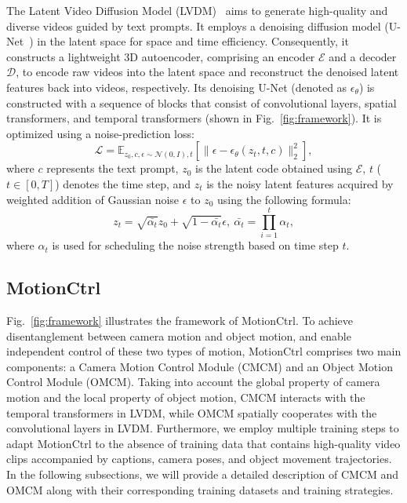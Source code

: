 \documentclass[sigconf]{acmart}
\begin{document}
The Latent Video Diffusion Model (LVDM)~\cite{he2022lvdm} aims to generate high-quality and diverse videos guided by text prompts. It employs a denoising diffusion model (U-Net~\cite{unet}) in the latent space for space and time efficiency. Consequently, it constructs a lightweight 3D autoencoder, comprising an encoder $\mathcal{E}$ and a decoder $\mathcal{D}$, to encode raw videos into the latent space and reconstruct the denoised latent features back into videos, respectively. Its denoising U-Net (denoted as $\mathcal{\epsilon_\theta}$) is constructed with a sequence of blocks that consist of convolutional layers, spatial transformers, and temporal transformers (shown in Fig.~\ref{fig:framework}). It is optimized using a noise-prediction loss:
\begin{equation}
    \mathcal{L} = \mathbb{E}_{z_0, c, \epsilon\sim\mathcal{N}(0, \mathit{I}), t}\left\lbrack 
\lVert \epsilon - \epsilon_\theta(z_t, t, c) \rVert_2^2 \right\rbrack,
\label{euqation: noise_preditcion_loss}
\end{equation}
where $c$ represents the text prompt, $z_0$ is the latent code obtained using $\mathcal{E}$, $t$ ($t \in [0, T]$) denotes the time step, and $z_t$ is the noisy latent features acquired by weighted addition of Gaussian noise $\epsilon$ to $z_0$ using the following formula:
\begin{equation}
    z_t = \sqrt{\bar{\alpha_t}}z_0 + \sqrt{1-\bar{\alpha_t}}\epsilon,~\bar{\alpha_t} = \prod_{i=1}^t\alpha_t,
\end{equation}
where $\alpha_t$ is used for scheduling the noise strength based on time step $t$.

\subsection{MotionCtrl}

Fig.~\ref{fig:framework} illustrates the framework of MotionCtrl. To achieve disentanglement between camera motion and object motion, and enable independent control of these two types of motion, MotionCtrl comprises two main components: a Camera Motion Control Module (CMCM) and an Object Motion Control Module (OMCM). 
Taking into account the global property of camera motion and the local property of object motion, CMCM interacts with the temporal transformers in LVDM, while OMCM spatially cooperates with the convolutional layers in LVDM. Furthermore, we employ multiple training steps to adapt MotionCtrl to the absence of training data that contains high-quality video clips accompanied by captions, camera poses, and object movement trajectories. In the following subsections, we will provide a detailed description of CMCM and OMCM along with their corresponding training datasets and training strategies.
\end{document}

